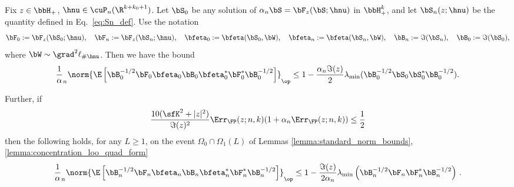 \begin{lemma}
\label{lemma:op_norm_bound_for_sols_fp}
Fix $z \in\bbH_+$, $\hnu \in \cuP_n(\R^{k+k_0+1})$.
Let $\bS_0$ be any solution of $\alpha_n \bS = \bF_z(\bS;\hnu)$ in    $\bbH_+^k$, and let $\bS_n(z;\hnu)$ be the quantity defined in Eq.~\eqref{eq:Sn_def}.
Use the notation
\begin{equation}
\bF_0 := \bF_z(\bS_0;\hnu),\quad \bF_n:=\bF_z(\bS_n;\hnu),\quad \bfeta_0  :=\bfeta(\bS_0, \bW),\quad \bfeta_n := \bfeta(\bS_n,\bW),\quad\bB_n := \Im(\bS_n),\quad\bB_0:=\Im(\bS_0),
\end{equation}
where $\bW\sim \grad^2\ell_{\# \hnu}$.
Then we have the bound
    \begin{equation}
    \nonumber
\frac1\alpha_n\norm{\E\left[\bB_0^{-1/2} \bF_0 \bfeta_0 \bB_0\bfeta_0^* \bF_0^*\bB_0^{-1/2}\right]}_\op \le 
1 -\frac{\alpha_n \Im(z)}{2} \lambda_{\min}(\bB_0^{-1/2} \bS_0 \bS_0^* \bB_0^{-1/2}).
    \end{equation}
    
Further, if 
\begin{equation}
\label{eq:n_n(z)}
     \frac{10(\sfK^2 + |z|^2)}{\Im(z)^2}\Err_{\FP}(z;n,k)(1 + \alpha_n\Err_{\FP}(z;n,k))  \le  \frac12
 \end{equation}
then the following holds,
for any $L\ge 1$,
on the event $\Omega_0\cap\Omega_1(L)$  of 
Lemmas \ref{lemma:standard_norm_bounds},
\ref{lemma:concentration_loo_quad_form}
    \begin{equation}
\frac1\alpha_n\norm{\E\left[\bB_n^{-1/2} \bF_n \bfeta_n \bB_n\bfeta_n^* \bF_n^*\bB_n^{-1/2}\right]}_\op 
    \le 1 -  \frac{\Im(z)}{2\alpha_n}\lambda_{\min} \left(\bB_n^{-1/2} \bF_n\bF_n^* \bB_n^{-1/2}\right)\, .
    \label{eq:SecondBoundFp}
    \end{equation}
    \end{lemma}

